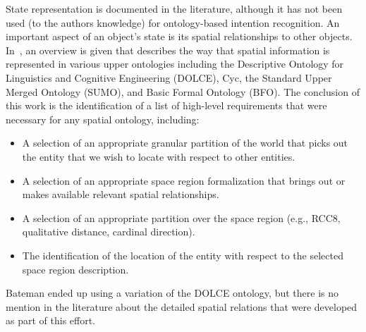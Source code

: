 \documentclass[preprint,12pt]{elsarticle}
\begin{document}
State representation is documented in the literature, although it has not been used (to the authors knowledge) for ontology-based intention recognition. An important aspect of an object's state is its spatial relationships to other objects. In~\cite{Bateman.2006}, an overview is given that describes the way that spatial information is represented in various upper ontologies including the Descriptive Ontology for Linguistics and Cognitive Engineering (DOLCE), Cyc, the Standard Upper Merged Ontology (SUMO), and Basic Formal Ontology (BFO). The conclusion of this work is the identification of a list of high-level requirements that were necessary for any spatial ontology, including:

\begin{itemize}
\item A selection of an appropriate granular partition of the world that picks out the entity that we wish to locate with respect to other entities.
\item A selection of an appropriate space region formalization that brings out or makes available relevant spatial relationships.
\item A selection of an appropriate partition over the space region (e.g., RCC8, qualitative distance, cardinal direction).
\item The identification of the location of the entity with respect to the selected space region description.
\end{itemize}
Bateman ended up using a variation of the DOLCE ontology, but there is no mention in the literature about the detailed spatial relations that were developed as part of this effort.
\end{document}
